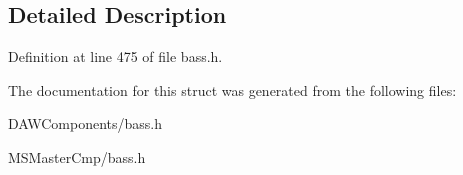 \subsection{Detailed Description}


Definition at line 475 of file bass.\-h.



The documentation for this struct was generated from the following files\-:\begin{DoxyCompactItemize}
\item 
D\-A\-W\-Components/bass.\-h\item 
M\-S\-Master\-Cmp/bass.\-h\end{DoxyCompactItemize}
